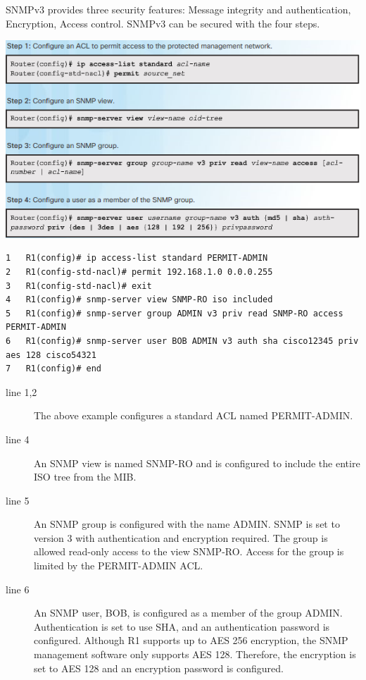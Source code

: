 SNMPv3 provides three security features: Message integrity and authentication, Encryption, Access control. SNMPv3 can be secured with the four steps.\\
\begin{listing}
\includegraphics[scale=1]{pictures/SNMPv3steps.PNG} 
\end{listing}

\begin{verbatim}
1	R1(config)# ip access-list standard PERMIT-ADMIN
2	R1(config-std-nacl)# permit 192.168.1.0 0.0.0.255
3	R1(config-std-nacl)# exit
4	R1(config)# snmp-server view SNMP-RO iso included
5	R1(config)# snmp-server group ADMIN v3 priv read SNMP-RO access PERMIT-ADMIN
6	R1(config)# snmp-server user BOB ADMIN v3 auth sha cisco12345 priv aes 128 cisco54321
7	R1(config)# end
\end{verbatim}

\begin{description}
\item[line 1,2] The above example configures a standard ACL named PERMIT-ADMIN. 
\item[line 4] An SNMP view is named SNMP-RO and is configured to include the entire ISO tree from the MIB. 
\item[line 5] An SNMP group is configured with the name ADMIN. SNMP is set to version 3 with authentication and encryption required. The group is allowed read-only access to the view SNMP-RO. Access for the group is limited by the PERMIT-ADMIN ACL. 
\item[line 6] An SNMP user, BOB, is configured as a member of the group ADMIN. Authentication is set to use SHA, and an authentication password is configured. Although R1 supports up to AES 256 encryption, the SNMP management software only supports AES 128. Therefore, the encryption is set to AES 128 and an encryption password is configured.
\end{description}

